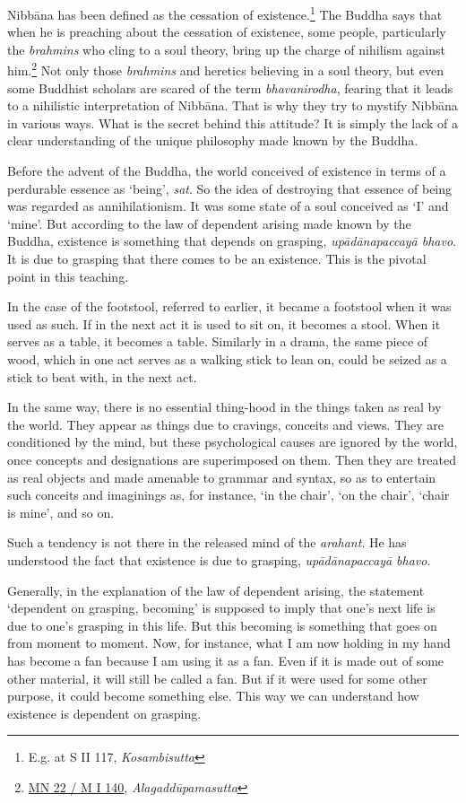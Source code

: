 Nibbāna has been defined as the cessation of existence.\footnote{E.g. at S II 117, \emph{Kosambisutta}} The Buddha says that when he is preaching about the cessation of existence, some people, particularly the \emph{brahmins} who cling to a soul theory, bring up the charge of nihilism against him.\footnote{\href{https://suttacentral.net/mn22/pli/ms}{MN 22 / M I 140}, \emph{Alagaddūpamasutta}} Not only those \emph{brahmins} and heretics believing in a soul theory, but even some Buddhist scholars are scared of the term \emph{bhavanirodha}, fearing that it leads to a nihilistic interpretation of Nibbāna. That is why they try to mystify Nibbāna in various ways. What is the secret behind this attitude? It is simply the lack of a clear understanding of the unique philosophy made known by the Buddha.

Before the advent of the Buddha, the world conceived of existence in terms of a perdurable essence as `being', \emph{sat}. So the idea of destroying that essence of being was regarded as annihilationism. It was some state of a soul conceived as `I' and `mine'. But according to the law of dependent arising made known by the Buddha, existence is something that depends on grasping, \emph{upādānapaccayā bhavo}. It is due to grasping that there comes to be an existence. This is the pivotal point in this teaching.

In the case of the footstool, referred to earlier, it became a footstool when it was used as such. If in the next act it is used to sit on, it becomes a stool. When it serves as a table, it becomes a table. Similarly in a drama, the same piece of wood, which in one act serves as a walking stick to lean on, could be seized as a stick to beat with, in the next act.

In the same way, there is no essential thing-hood in the things taken as real by the world. They appear as things due to cravings, conceits and views. They are conditioned by the mind, but these psychological causes are ignored by the world, once concepts and designations are superimposed on them. Then they are treated as real objects and made amenable to grammar and syntax, so as to entertain such conceits and imaginings as, for instance, `in the chair', `on the chair', `chair is mine', and so on.

Such a tendency is not there in the released mind of the \emph{arahant}. He has understood the fact that existence is due to grasping, \emph{upādānapaccayā bhavo}.

Generally, in the explanation of the law of dependent arising, the statement `dependent on grasping, becoming' is supposed to imply that one's next life is due to one's grasping in this life. But this becoming is something that goes on from moment to moment. Now, for instance, what I am now holding in my hand has become a fan because I am using it as a fan. Even if it is made out of some other material, it will still be called a fan. But if it were used for some other purpose, it could become something else. This way we can understand how existence is dependent on grasping.


